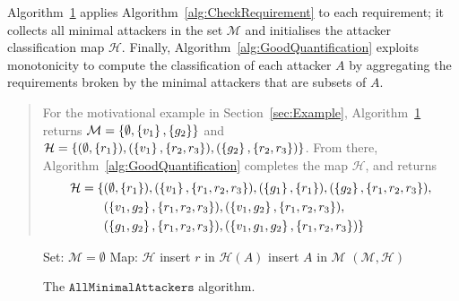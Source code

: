{Algorithm~\ref{alg:MinimalAttackers} applies Algorithm~\ref{alg:CheckRequirement} to each requirement; it collects all minimal attackers in the set $\mathcal{M}$ and initialises the attacker classification map $\mathcal{H}$. Finally, Algorithm~\ref{alg:GoodQuantification} exploits monotonicity to compute the classification of each attacker $A$ by aggregating the requirements broken by the minimal attackers that are subsets of $A$.

\begin{quote}
For the motivational example in Section~\ref{sec:Example}, Algorithm~\ref{alg:MinimalAttackers} returns $\mathcal{M}=\left\{\emptyset,\left\{v_1\right\}, \left\{g_2\right\}\right\}$ and $\mathcal{H}=\left\{(\emptyset,\left\{r_1\right\}), (\left\{v_1\right\},\left\{r_2, r_3\right\}),  (\left\{g_2\right\},\left\{r_2, r_3\right\})\right\}$. From there,  Algorithm~\ref{alg:GoodQuantification} completes the map $\mathcal{H}$, and returns
\begin{align*}
\mathcal{H}=\{&(\emptyset,\left\{r_1\right\}), (\left\{v_1\right\},\left\{r_1,r_2, r_3\right\}),  (\left\{g_1\right\},\left\{r_1\right\}),(\left\{g_2\right\},\left\{r_1,r_2, r_3\right\}), \\
&(\left\{v_1,g_2\right\},\left\{r_1,r_2, r_3\right\}),(\left\{v_1,g_2\right\},\left\{r_1,r_2, r_3\right\}),\\
&(\left\{g_1,g_2\right\},\left\{r_1,r_2, r_3\right\}),(\left\{v_1,g_1,g_2\right\},\left\{r_1,r_2, r_3\right\})\}
\end{align*}
\end{quote}
\vspace{-0.5cm}

\begin{figure}[!t]
\centering
{
\begin{algorithm}[H]
Set: $\mathcal{M}=\emptyset$\;
Map: $\mathcal{H}$\;
	{
		{
			insert $r$ in $\mathcal{H}(A)$\;
			insert $A$ in $\mathcal{M}$\;
		}
	 }
 \Return $(\mathcal{M},\mathcal{H})$\;
 \caption{The $\mathtt{AllMinimalAttackers}$ algorithm. }
 \label{alg:MinimalAttackers}
\end{algorithm}}
\vspace{-0.5cm}
\end{figure}


\begin{figure}[!t]
\centering
{
\begin{algorithm}[H]


\end{algorithm}}
\end{figure}}
